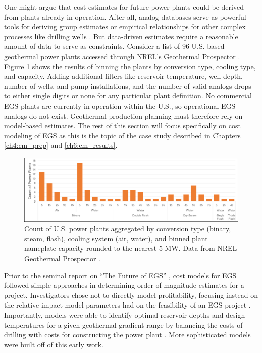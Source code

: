One might argue that cost estimates for future power plants could be derived from plants already in operation. After all, analog databases serve as powerful tools for deriving group estimates or empirical relationships for other complex processes like drilling wells \citep{lukawski_cost_2014, tester_future_2006}. But data-driven estimates require a reasonable amount of data to serve as constraints. Consider a list of 96 U.S.-based geothermal power plants accessed through NREL’s Geothermal Prospector \citep{nrel_geothermal_2021}. Figure \ref{fig:nrel_us_pplants} shows the results of binning the plants by conversion type, cooling type, and capacity. Adding additional filters like reservoir temperature, well depth, number of wells, and pump installations, and the number of valid analogs drops to either single digits or none for any particular plant definition. No commercial EGS plants are currently in operation within the U.S., so operational EGS analogs do not exist. Geothermal production planning must therefore rely on model-based estimates. The rest of this section will focus specifically on cost modeling of EGS as this is the topic of the case study described in Chapters \ref{ch4:cm_prep} and \ref{ch6:cm_results}.

\begin{figure}
\centering
\includegraphics[width=.95\textwidth]{templates/images/Figure-NREL_US_PowerPlants.png}
\caption[Power plants in the United States]{Count of U.S. power plants aggregated by conversion type (binary, steam, flash), cooling system (air, water), and binned plant nameplate capacity rounded to the nearest 5 MW. Data from NREL Geothermal Prospector \protect\citep{nrel_geothermal_2021}.}
\label{fig:nrel_us_pplants}
\end{figure}

Prior to the seminal report on ``The Future of EGS'' \citep{tester_future_2006}, cost models for EGS followed simple approaches in determining order of magnitude estimates for a project. Investigators chose not to directly model profitability, focusing instead on the relative impact model parameters had on the feasibility of an EGS project \citep{augustine_hydrothermal_2009}. Importantly, models were able to identify optimal reservoir depths and design temperatures for a given geothermal gradient range by balancing the costs of drilling with costs for constructing the power plant \citep{tester_economic_1990}. More sophisticated models were built off of this early work.

